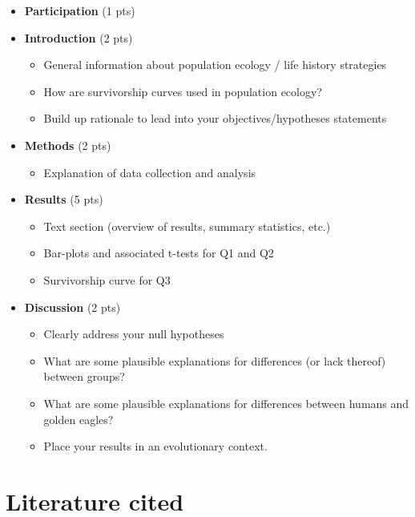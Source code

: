 \documentclass[11pt,]{article}
\providecommand{\tightlist}{%
\setlength{\itemsep}{0pt}\setlength{\parskip}{0pt}}
\begin{document}
\begin{itemize}
\item
  \textbf{Participation} (1 pts)
\item
  \textbf{Introduction} (2 pts)

  \begin{itemize}
  \tightlist
  \item
    General information about population ecology / life history
    strategies
  \item
    How are survivorship curves used in population ecology?
  \item
    Build up rationale to lead into your objectives/hypotheses
    statements
  \end{itemize}
\item
  \textbf{Methods} (2 pts)

  \begin{itemize}
  \tightlist
  \item
    Explanation of data collection and analysis
  \end{itemize}
\item
  \textbf{Results} (5 pts)

  \begin{itemize}
  \tightlist
  \item
    Text section (overview of results, summary statistics, etc.)
  \item
    Bar-plots and associated t-tests for Q1 and Q2
  \item
    Survivorship curve for Q3
  \end{itemize}
\item
  \textbf{Discussion} (2 pts)

  \begin{itemize}
  \tightlist
  \item
    Clearly address your null hypotheses
  \item
    What are some plausible explanations for differences (or lack
    thereof) between groups?
  \item
    What are some plausible explanations for differences between humans
    and golden eagles?
  \item
    Place your results in an evolutionary context.
  \end{itemize}
\end{itemize}

\medskip

\section{Literature cited}\label{literature-cited}
\end{document}
